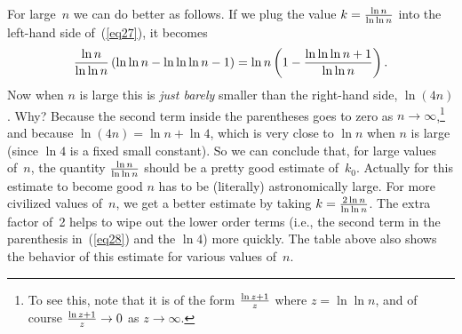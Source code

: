 \documentclass[11pt]{article}
\begin{document}
For large~$n$ we can do better as follows.
If we plug the value $k={{\ln n}\over{\ln\ln n}}$
into the left-hand side of~(\ref{eq27}), it becomes
\begin{equation}\label{eq28}
   {{\ln n}\over{\ln\ln n}}\left(\ln\ln n - \ln\ln\ln n -1\right)
            = \ln n\left(1 - {{\ln\ln\ln n + 1}\over{\ln\ln n}}\right).
\end{equation}
Now when $n$ is large
this is {\it just barely\/} smaller than the right-hand side, $\ln(4n)$.
Why?  Because the second term inside the parentheses goes to zero
as $n\to\infty$,\footnote{To see this, note that it is of the form 
${{\ln z + 1}\over{z}}$ where $z=\ln\ln n$, and of course 
${{\ln z + 1}\over z}\to 0$ as $z\to\infty$.} and because 
$\ln(4n)=\ln n + \ln 4$, which is very close to $\ln n$ when $n$
is large (since $\ln 4$ is a fixed small constant).  So we can conclude that,
for large values of~$n$, the quantity ${{\ln n}\over{\ln\ln n}}$ should
be a pretty good estimate of~$k_0$.  Actually for this estimate
to become good $n$ has to be (literally) astronomically large.  
For more civilized values of~$n$, we get a better estimate by
taking $k={{2\ln n}\over{\ln\ln n}}$.  The extra factor of~2
helps to wipe out the lower order terms (i.e., the second term
in the parenthesis in~(\ref{eq28}) and the $\ln 4$) more quickly.
The table above also shows the behavior of this estimate for
various values of~$n$.
\end{document}
